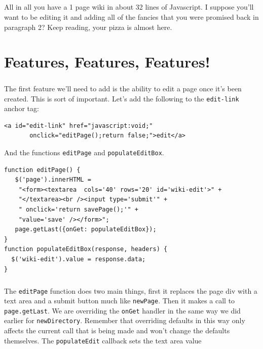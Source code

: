 \documentclass{report}
\begin{document}
\paragraph{}


All in all you have a 1 page wiki in about 32 lines of Javascript. I
suppose you'll want to be editing it and adding all of the fancies
that you were promised back in paragraph 2? Keep reading, your pizza
is almost here.

\chapter{Features, Features, Features!}
\paragraph{}
The first feature we'll need to add is the ability to edit a page once
it's been created. This is sort of important. Let's add the following
to the \texttt{edit-link} anchor tag:

\begin{Verbatim}[frame=single]
    <a id="edit-link" href="javascript:void;"
       onclick="editPage();return false;">edit</a>
\end{Verbatim}

And the functions \texttt{editPage} and \texttt{populateEditBox}.

\begin{Verbatim}[frame=single]
function editPage() {
   $('page').innerHTML = 
    "<form><textarea  cols='40' rows='20' id='wiki-edit'>" + 
    "</textarea><br /><input type='submit'" +
    " onclick='return savePage();'" +
    "value='save' /></form>";
   page.getLast({onGet: populateEditBox});
}
function populateEditBox(response, headers) {
  $('wiki-edit').value = response.data;
}
\end{Verbatim} 

\paragraph{}
The \texttt{editPage} function does two main things, first it replaces
the page div with a text area and a submit button much like
\texttt{newPage}. Then it makes a call to \texttt{page.getLast}. We
are overriding the \texttt{onGet} handler in the same way we did
earlier for \texttt{newDirectory}. Remember that overriding defaults
in this way only affects the current call that is being made and won't
change the defaults themselves. The \texttt{populateEdit} callback
sets the text area value
\end{document}
